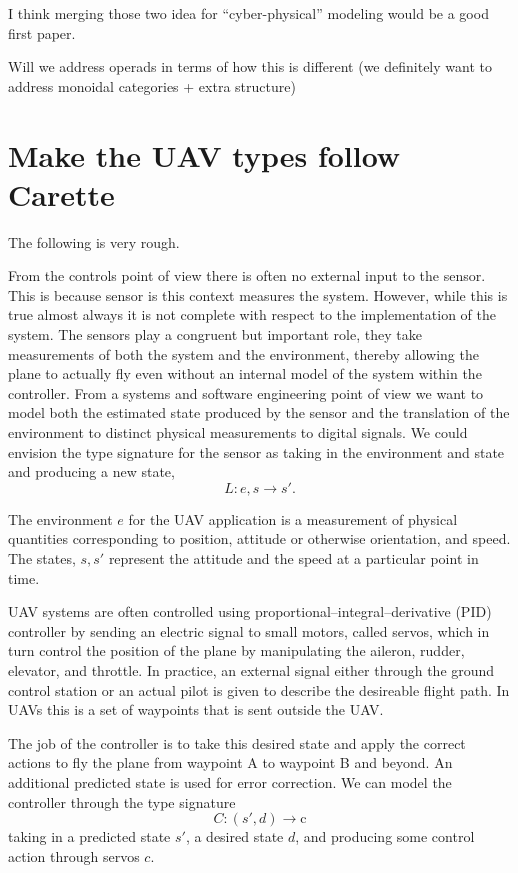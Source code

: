\documentclass{article}
\begin{document}
I think merging those two idea for ``cyber-physical'' modeling would be a good first paper.

Will we address operads in terms
of how this is different (we definitely want to address
monoidal categories + extra structure)
\section{Make the UAV types follow Carette}

The following is very rough.

From the controls point
of view there is often no external input to the sensor.
This is because sensor is this context measures the system.
However, while this is true almost always it is not complete
with respect to the implementation of the system.
The sensors play a congruent but important role,
they take measurements of both the system
and the environment, thereby allowing the plane to actually fly
even without an internal model of the system within the controller.
From a systems and software engineering point of view we want to model both
the estimated state produced by the sensor and the translation
of the environment to distinct physical measurements
to digital signals.
We could envision the type signature for the sensor as
taking in the environment and state and producing a new state,
\[{L}: e, s \rightarrow s'.\]


The environment \(e\) for the UAV application is a measurement
of physical quantities corresponding to position, attitude
or otherwise orientation, and speed.
The states, \(s, s'\) represent the attitude
and the speed at a particular point in time.

UAV systems are often controlled
using proportional--integral--derivative (PID) controller
by sending an electric signal to small motors, called servos,
which in turn control the position of the plane
by manipulating the aileron, rudder, elevator, and throttle.
In practice, an external signal
either through the ground control station
or an actual pilot is given to describe the desireable flight path.
In UAVs this is a set of waypoints that is sent outside the UAV.

The job of the controller is to take this desired state
and apply the correct actions to fly the plane from waypoint A
to waypoint B and beyond. An additional predicted state is used for error correction.
We can model the controller
through the type signature \[{C}: (s', d) \rightarrow \text{c}\] taking
in a predicted state $s'$, a desired state $d$,
and producing some control action through servos $c$.
\end{document}
